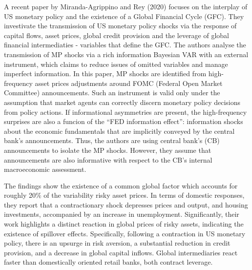 \documentclass[11pt,a4paper]{article}
\begin{document}
A recent paper by Miranda-Agrippino and Rey (2020) focuses on the interplay of US monetary policy and the existence of a Global Financial Cycle (GFC). They investivate the transmission of US monetary policy shocks via the response of capital flows, asset prices, global credit provision and the leverage of global financial intermediaties - variables that define the GFC.
The authors analyse the transmission of MP shocks via a rich information Bayesian VAR with an external instrument, which claims to reduce issues of omitted variables and manage imperfect information. 
In this paper, MP shocks are identified from high-frequency asset prices adjustments around FOMC (Federal Open Market Committee) announcements. 
Such an instrument is valid only under the assumption that market agents can correctly discern monetary policy decisions from policy actions. If informational asymmetries are present, the high-frequency surprises are also a funcion of the \enquote{FED information effect}: information shocks about the economic fundamentals that are implicitly conveyed by the central bank's announcements. 
Thus, the authors are using central bank's (CB) announcements to isolate the MP shocks. However, they assume that announcements are also informative with respect to the CB's internal macroeconomic assessment. 


The findings show the existence of a common global factor which accounts for roughly 20\% of the variability risky asset prices. 
In terms of domestic responses, they report that a contractionary shock depresses prices and output, and housing investments, accompanied by an increase in unemployment.
Significantly, their work highlights a distinct reaction in global prices of risky assets, indicating the existence of spillover effects.
Specifically, following a contraction in US monetary policy, there is an upsurge in risk aversion, a substantial reduction in credit provision, and a decrease in global capital inflows. Global intermediaries react faster than domestically oriented retail banks, both contract leverage.
\end{document}
